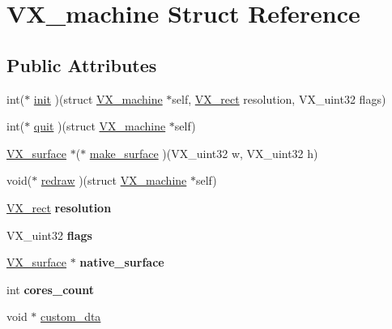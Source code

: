 \hypertarget{structVX__machine}{\section{V\-X\-\_\-machine Struct Reference}
\label{structVX__machine}
}
\subsection*{Public Attributes}
\begin{DoxyCompactItemize}
\item 
int($\ast$ \hyperlink{structVX__machine_ad57f58fbf3748564540fc194ba5127e5}{init} )(struct \hyperlink{structVX__machine}{V\-X\-\_\-machine} $\ast$self, \hyperlink{structVX__rect}{V\-X\-\_\-rect} resolution, V\-X\-\_\-uint32 flags)
\item 
int($\ast$ \hyperlink{structVX__machine_aa5cef4ff4d7c4bcceff65c2556538276}{quit} )(struct \hyperlink{structVX__machine}{V\-X\-\_\-machine} $\ast$self)
\item 
\hyperlink{structVX__surface}{V\-X\-\_\-surface} $\ast$($\ast$ \hyperlink{structVX__machine_a0bd87154ba42102c4577f063a79a6341}{make\-\_\-surface} )(V\-X\-\_\-uint32 w, V\-X\-\_\-uint32 h)
\item 
void($\ast$ \hyperlink{structVX__machine_a5f2254de23697f967ca4aad5eb4ca77f}{redraw} )(struct \hyperlink{structVX__machine}{V\-X\-\_\-machine} $\ast$self)
\item 
\hypertarget{structVX__machine_a3ad34b72424bdf813c266bb18d6762a8}{\hyperlink{structVX__rect}{V\-X\-\_\-rect} {\bfseries resolution}}\label{structVX__machine_a3ad34b72424bdf813c266bb18d6762a8}

\item 
\hypertarget{structVX__machine_a1f2a8b54415c186c49a5a2a894d86831}{V\-X\-\_\-uint32 {\bfseries flags}}\label{structVX__machine_a1f2a8b54415c186c49a5a2a894d86831}

\item 
\hypertarget{structVX__machine_ad7039e581a2c8cfaa9d6c7a472b13ab7}{\hyperlink{structVX__surface}{V\-X\-\_\-surface} $\ast$ {\bfseries native\-\_\-surface}}\label{structVX__machine_ad7039e581a2c8cfaa9d6c7a472b13ab7}

\item 
\hypertarget{structVX__machine_aa10bff31ff3771d583f2ca4665296bf7}{int {\bfseries cores\-\_\-count}}\label{structVX__machine_aa10bff31ff3771d583f2ca4665296bf7}

\item 
void $\ast$ \hyperlink{structVX__machine_a3dad4ae38a7b001a095ed4fe36d62f12}{custom\-\_\-dta}
\end{DoxyCompactItemize}



